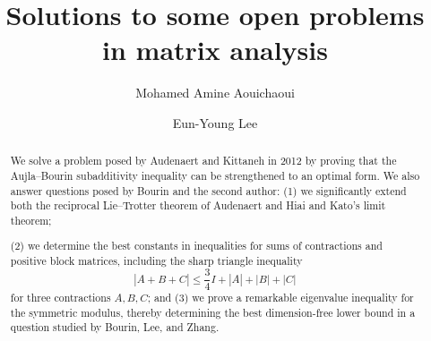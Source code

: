 \documentclass[11pt]{amsart}
\title[Solutions to some open problems]{Solutions to some open problems in matrix analysis}
\author{Mohamed Amine Aouichaoui}
\author{Eun-Young Lee}
\numberwithin{equation}{section}
\begin{document}


\begin{abstract} We solve a problem posed by Audenaert and Kittaneh in 2012 by proving
that the Aujla--Bourin subadditivity inequality can be strengthened
to an optimal form. We also answer
questions posed by Bourin and the second author:
(1)
we significantly extend both the reciprocal Lie--Trotter theorem
of Audenaert and Hiai and Kato's limit theorem;

(2) we determine the best constants in inequalities for sums
of contractions and positive block matrices, including the
sharp triangle inequality
$$
|A+B+C| \leq \frac{3}{4} I + |A|+|B|+|C|
$$
for three contractions $A,B,C$; and
(3) 
we prove a remarkable eigenvalue inequality for the symmetric
modulus, thereby determining the best dimension-free lower bound
in a question studied by Bourin, Lee, and Zhang.

\end{abstract}


\maketitle
\end{document}
